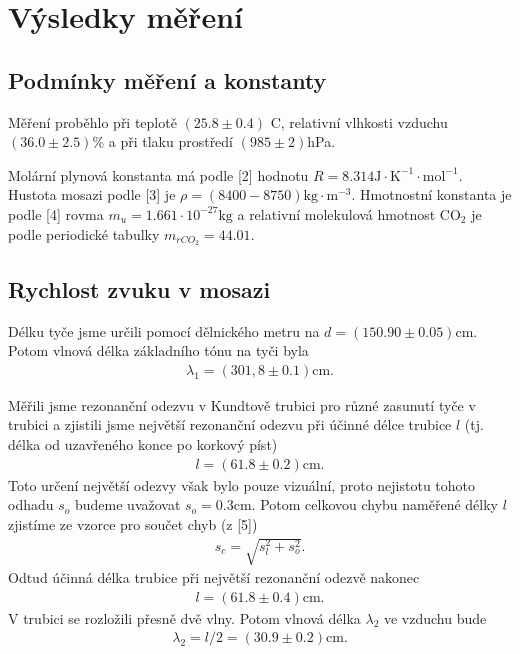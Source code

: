 \section{Výsledky měření}
\subsection{Podmínky měření a konstanty}
\par Měření proběhlo při teplotě $(25.8 \pm 0.4)$ \degree C, relativní vlhkosti vzduchu $(36.0 \pm 2.5)$\% a při tlaku prostředí $(985 \pm 2)$hPa.
\par Molární plynová konstanta má podle [2] hodnotu  $R = 8.314 \mathrm{J \cdot K^{-1} \cdot mol^{-1}}$. Hustota mosazi podle [3] je $\rho = (8 400-8 750) \mathrm{kg \cdot m^{-3}}$. Hmotnostní konstanta je podle [4] rovma $m_u = 1.661 \cdot 10^{-27}\mathrm{kg}$ a relativní molekulová hmotnost $\mathrm{CO_2}$  je podle periodické tabulky $m_{rCO_2} = 44.01$.
\subsection{Rychlost zvuku v mosazi}
\par Délku tyče jsme určili pomocí dělnického metru na $d = (150.90 \pm 0.05) \mathrm{cm}$. Potom vlnová délka základního tónu na tyči byla
\begin{align*}
    \lambda_1 = (301,8 \pm 0.1) \mathrm{cm}.
\end{align*}
\par Měřili jsme rezonanční odezvu v Kundtově trubici pro různé zasunutí tyče v trubici a zjistili jsme největší rezonanční odezvu při účinné délce trubice $l$ (tj. délka od uzavřeného konce po korkový píst) 
\begin{align*}
  l = (61.8 \pm 0.2) \mathrm{cm}.
\end{align*}
Toto určení největší odezvy však bylo pouze vizuální, proto nejistotu tohoto odhadu $s_o$ budeme uvažovat $s_o = 0.3 \mathrm{cm}$. Potom celkovou chybu naměřené délky $l$ zjistíme ze vzorce pro součet chyb (z [5])
\begin{align}
    s_c = \sqrt{s^2_l + s^2_o}.
\end{align}
Odtud účinná délka trubice při největší rezonanční odezvě nakonec
\begin{align*}
    l = (61.8 \pm 0.4) \mathrm{cm}.
\end{align*}
V trubici se rozložili přesně dvě vlny. Potom vlnová délka $\lambda_2$ ve vzduchu bude 
\begin{align*}
    \lambda_2 = l/2 = (30.9 \pm 0.2)\mathrm{cm}.
\end{align*}

